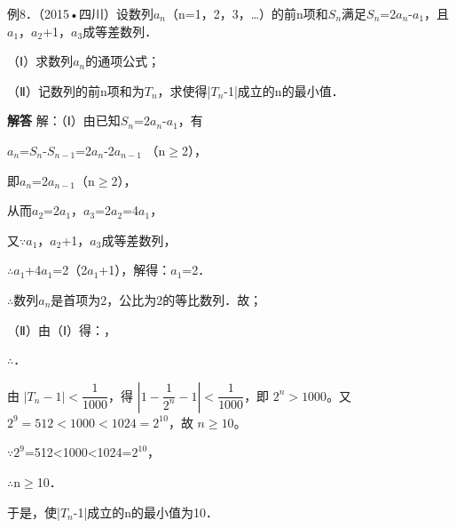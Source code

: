 例8．（2015•四川）设数列{\ensuremath{a_{n}}}（n=1，2，3，\ldots{}）的前n项和\ensuremath{S_{n}}满足\ensuremath{S_{n}}=2\ensuremath{a_{n}}-\ensuremath{a_{1}}，且\ensuremath{a_{1}}，\ensuremath{a_{2}}+1，\ensuremath{a_{3}}成等差数列．\par
（Ⅰ）求数列{\ensuremath{a_{n}}}的通项公式；\par
（Ⅱ）记数列{}的前n项和为\ensuremath{T_{n}}，求使得|\ensuremath{T_{n}}-1|成立的n的最小值．\par
\QuestionSpace{4.8cm}
\ifshowanswers
\par\begingroup\color{solutioncolor}\noindent\textbf{解答}\quad
解：（Ⅰ）由已知\ensuremath{S_{n}}=2\ensuremath{a_{n}}-\ensuremath{a_{1}}，有\par
\ensuremath{a_{n}}=\ensuremath{S_{n}}-\ensuremath{S_{n-1}}=2\ensuremath{a_{n}}-2\ensuremath{a_{n-1}} （n\ensuremath{\ge}2），\par
即\ensuremath{a_{n}}=2\ensuremath{a_{n-1}}（n\ensuremath{\ge}2），\par
从而\ensuremath{a_{2}}=2\ensuremath{a_{1}}，\ensuremath{a_{3}}=2\ensuremath{a_{2}}=4\ensuremath{a_{1}}，\par
又\ensuremath{\because}\ensuremath{a_{1}}，\ensuremath{a_{2}}+1，\ensuremath{a_{3}}成等差数列，\par
\ensuremath{\therefore}\ensuremath{a_{1}}+4\ensuremath{a_{1}}=2（2\ensuremath{a_{1}}+1），解得：\ensuremath{a_{1}}=2．\par
\ensuremath{\therefore}数列{\ensuremath{a_{n}}}是首项为2，公比为2的等比数列．故；\par
（Ⅱ）由（Ⅰ）得：，\par
\ensuremath{\therefore}．\par
由 $|T_n-1|<\dfrac1{1000}$，得 $\left|1-\dfrac1{2^n}-1\right|<\dfrac1{1000}$，即 $2^n>1000$。又 $2^9=512<1000<1024=2^{10}$，故 $n\geq10$。\par
\ensuremath{\because}\ensuremath{2^{9}}=512<1000<1024=\ensuremath{2^{10}}，\par
\ensuremath{\therefore}n\ensuremath{\ge}10．\par
于是，使|\ensuremath{T_{n}}-1|成立的n的最小值为10．\par
\par\endgroup\fi


